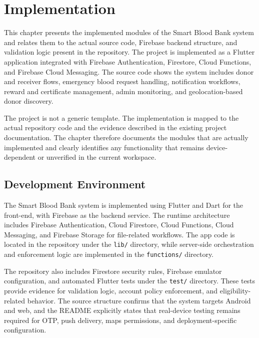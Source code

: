 ﻿%

\chapter{Implementation}

This chapter presents the implemented modules of the Smart Blood Bank system and relates them to the actual source code, Firebase backend structure, and validation logic present in the repository. The project is implemented as a Flutter application integrated with Firebase Authentication, Firestore, Cloud Functions, and Firebase Cloud Messaging. The source code shows the system includes donor and receiver flows, emergency blood request handling, notification workflows, reward and certificate management, admin monitoring, and geolocation-based donor discovery.

The project is not a generic template. The implementation is mapped to the actual repository code and the evidence described in the existing project documentation. The chapter therefore documents the modules that are actually implemented and clearly identifies any functionality that remains device-dependent or unverified in the current workspace.


\section{Development Environment}

The Smart Blood Bank system is implemented using Flutter and Dart for the front-end, with Firebase as the backend service. The runtime architecture includes Firebase Authentication, Cloud Firestore, Cloud Functions, Cloud Messaging, and Firebase Storage for file-related workflows. The app code is located in the repository under the \texttt{lib/} directory, while server-side orchestration and enforcement logic are implemented in the \texttt{functions/} directory.

The repository also includes Firestore security rules, Firebase emulator configuration, and automated Flutter tests under the \texttt{test/} directory. These tests provide evidence for validation logic, account policy enforcement, and eligibility-related behavior. The source structure confirms that the system targets Android and web, and the README explicitly states that real-device testing remains required for OTP, push delivery, maps permissions, and deployment-specific configuration.

